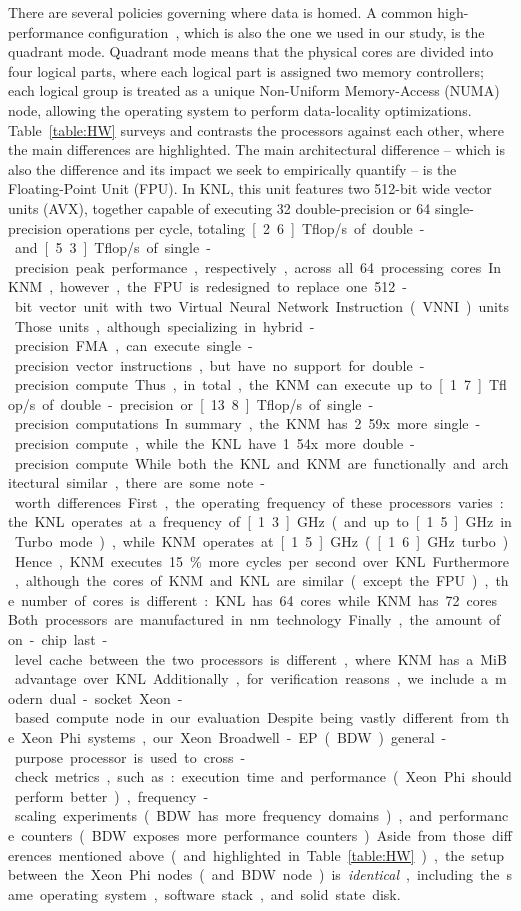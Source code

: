There are several policies governing where data is homed. A common high-performance configuration~\cite{gawande_scaling_2017}, which is also the one we used in our study, is the quadrant mode. Quadrant mode means that the physical cores are divided into four logical parts, where each logical part is assigned two memory controllers; each logical group is treated as a unique Non-Uniform Memory-Access (NUMA) node, allowing the operating system to perform data-locality optimizations.
Table~\ref{table:HW} surveys and contrasts the processors against each other, where the main differences are highlighted. The main architectural difference -- which is also the difference and its impact we seek to empirically quantify -- is the Floating-Point Unit (FPU). In KNL, this unit features two 512-bit wide vector units (AVX), together capable of executing 32 double-precision or 64 single-precision operations per cycle, totaling~\unit[2.6]{Tflop/s} of double- and~\unit[5.3]{Tflop/s} of single-precision peak performance, respectively, across all 64 processing cores. In KNM, however, the FPU is redesigned to replace one 512-bit vector unit with two Virtual Neural Network Instruction (VNNI) units. Those units, although specializing in hybrid-precision FMA, can execute single-precision vector instructions, but have no support for double-precision compute. Thus, in total, the KNM can execute up to~\unit[1.7]{Tflop/s} of double-precision or~\unit[13.8]{Tflop/s} of single-precision computations. In summary, the KNM has~2.59x more single-precision compute, while the KNL have~1.54x more double-precision compute.

While both the KNL and KNM are functionally and architectural similar, there are some note-worth differences.
First, the operating frequency of these processors varies: the KNL operates at a frequency of~\unit[1.3]{GHz}
(and up to~\unit[1.5]{GHz} in Turbo mode), while KNM operates at~\unit[1.5]{GHz} (\unit[1.6]{GHz} turbo).
Hence, KNM executes~15\% more cycles per second over KNL. Furthermore, although the cores of KNM and KNL are
similar (except the FPU), the number of cores is different: KNL has~64 cores while KNM has~72 cores.
Both processors are manufactured in~\unit[14]{nm} technology. Finally, the amount of on-chip last-level cache
between the two processors is different, where KNM has a~\unit[4]{MiB} advantage over KNL.

Additionally, for verification reasons, we include a modern dual-socket Xeon-based compute node in our evaluation. Despite being vastly different from the Xeon Phi systems, our Xeon Broadwell-EP (BDW) general-purpose processor is used to cross-check metrics, such as: execution time and performance (Xeon Phi should perform better), frequency-scaling experiments (BDW has more frequency domains), and performance counters (BDW exposes more performance counters).
Aside from those differences mentioned above (and highlighted in Table~\ref{table:HW}), the setup between the Xeon Phi nodes (and BDW node) is \textit{identical}, including the same operating system, software stack, and solid state disk. %

